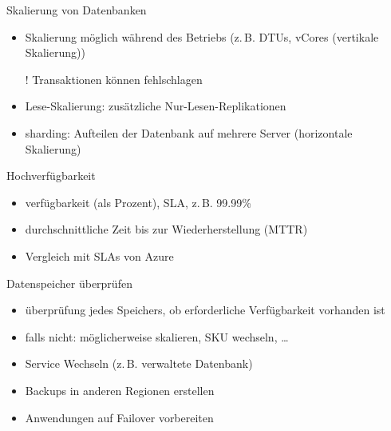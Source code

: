 \begin{flashcard}[]{Skalierung von Datenbanken}
  \begin{itemize}
    \item Skalierung möglich während des Betriebs (z.\,B. DTUs, vCores (vertikale Skalierung))
    \item[!] Transaktionen können fehlschlagen
    \item Lese-Skalierung: zusätzliche Nur-Lesen-Replikationen
    \item sharding: Aufteilen der Datenbank auf mehrere Server (horizontale Skalierung)
  \end{itemize}
\end{flashcard}


\begin{flashcard}[]{Hochverfügbarkeit}
  \begin{itemize}
    \item verfügbarkeit (als Prozent), SLA, z.\,B. 99.99\%
    \item durchschnittliche Zeit bis zur Wiederherstellung (MTTR)
    \item Vergleich mit SLAs von Azure
  \end{itemize}
\end{flashcard}

\begin{flashcard}[]{Datenspeicher überprüfen}
  \begin{itemize}
    \item überprüfung jedes Speichers, ob erforderliche Verfügbarkeit vorhanden ist
    \item falls nicht: möglicherweise skalieren, SKU wechseln, \ldots
    \item Service Wechseln (z.\,B. verwaltete Datenbank)
    \item Backups in anderen Regionen erstellen
    \item Anwendungen auf Failover vorbereiten
  \end{itemize}
\end{flashcard}

